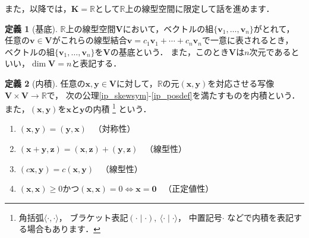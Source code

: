 \documentclass[dvipdfmx]{jsarticle}
\theoremstyle{definition}
\newtheorem{definition}{定義}[section]
\newtheorem{example}[definition]{例}
\begin{document}
また，以降では，$\bm{K} = \mathbb{R}$として$\mathbb{R}$上の線型空間に限定して話を進めます．
\begin{comment}
\begin{example}
    実数を成分として持つ$n$次正方行列の全体
    \begin{align*}
        \mathrm{M}_n(\mathbb{R}) = \{ A \mid A \text{は$n$次実正方行列} \}
    \end{align*}
    は$\mathbb{R}$上の線型空間．
\end{example}
\begin{example}
    高々$n$次の実数係数多項式の全体
    \begin{align*}
        \mathbb{R}[x]_n = \left\{ \sum_{i=0}^{n} a_i x^k \ \middle| \ a_i \in \mathbb{R} \right\}
    \end{align*}
\end{example}
\begin{example}
    $n$階斉次線型微分方程式の解全体
    \begin{align*}
        \left\{ f(x) \in \mathbb{R}[x]_n \ \middle| \ \sum_{k=0}^{n} a_{k}(x) f^{k}(x) = 0 \right\}
    \end{align*}
\end{example}
\end{comment}
\begin{definition}[基底]
    $\mathbb{R}$上の線型空間$\bm{V}$において，ベクトルの組$\{ \bm{v}_1, \ldots, \bm{v}_n\}$がとれて，
    任意の$\bm{v} \in \bm{V}$がこれらの線型結合$\bm{v} = c_1 \bm{v}_1 + \cdots + c_n \bm{v}_n$で一意に表されるとき，
    ベクトルの組$\{ \bm{v}_1, \ldots, \bm{v}_n \}$を$\bm{V}$の基底という．
    また，このとき$\bm{V}$は$n$次元であるといい，$\dim{\bm{V}} = n$と表記する．
\end{definition}
\begin{definition}[内積]
    任意の$\bm{x}, \bm{y} \in \bm{V}$に対して，$\mathbb{R}$の元$(\bm{x}, \bm{y})$を対応させる写像$\bm{V} \times \bm{V} \to \mathbb{R}$で，
    次の公理\ref{ip_skewsym}-\ref{ip_posdef}を満たすものを内積という．
    また，$(\bm{x}, \bm{y})$を$\bm{x}$と$\bm{y}$の内積
    \footnote{
        角括弧$\langle \cdot, \cdot \rangle$，
        ブラケット表記$(\cdot \mid \cdot), \ \langle \cdot \mid \cdot \rangle$，
        中置記号$\cdot$
        などで内積を表記する場合もあります．
    }
    という．
    \begin{enumerate}
        \setlength{\leftskip}{2em}
        \item $(\bm{x}, \bm{y}) = (\bm{y}, \bm{x})$ \ （対称性）
            \label{ip_skewsym}
        \item $(\bm{x}+\bm{y}, \bm{z}) = (\bm{x}, \bm{z}) + (\bm{y}, \bm{z})$ \ （線型性）
            \label{ip_linear_add}
        \item $(c\bm{x}, \bm{y}) = c(\bm{x}, \bm{y})$ \ （線型性）
            \label{ip_linear_mul}
        \item $(\bm{x}, \bm{x}) \geq 0$かつ$(\bm{x}, \bm{x}) = 0 \Leftrightarrow \bm{x} = \bm{0}$ \ （正定値性）
            \label{ip_posdef}
    \end{enumerate}
\end{definition}
\end{document}
